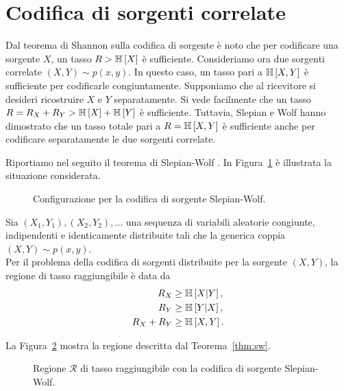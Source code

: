 \section{Codifica di sorgenti correlate}
\label{sec:correlated-sources-encoding}

Dal teorema di Shannon sulla codifica di sorgente
\cite{10.1002/j.1538-7305.1948.tb01338.x} è noto che per codificare una
sorgente \(X\), un tasso \(R > \mathbb{H}\left[ X \right]\) è sufficiente. Consideriamo ora
due sorgenti correlate \((X,Y) \sim p(x, y)\). In questo caso, un tasso pari a
\(\mathbb{H}\left[ X,Y \right]\) è sufficiente per codificarle congiuntamente. Supponiamo che
al ricevitore si desideri ricostruire \(X\) e \(Y\) separatamente. Si vede
facilmente che un tasso \(R = R_X + R_Y > \mathbb{H}\left[ X \right] + \mathbb{H}\left[ Y \right]\) è
sufficiente. Tuttavia, Slepian e Wolf \cite{1055037} hanno dimostrato che un
tasso totale pari a \(R = \mathbb{H}\left[ X,Y \right]\) è sufficiente anche per codificare
separatamente le due sorgenti correlate.

Riportiamo nel seguito il teorema di Slepian-Wolf
\cite{10.1002/047174882X.ch15}. In Figura~\ref{fig:sw-configuration} è
illustrata la situazione considerata.

\begin{figure}[ht]
    \centering
    
    \caption{Configurazione per la codifica di sorgente Slepian-Wolf.}
    \label{fig:sw-configuration}
\end{figure}

\begin{thm}
    \label{thm:sw}

    Sia \((X_1,Y_1),(X_2,Y_2),\dots\) una sequenza di variabili aleatorie
    congiunte, indipendenti e identicamente distribuite tali che la generica
    coppia \((X,Y) \sim p(x, y)\).\\
    Per il problema della codifica di sorgenti distribuite per la sorgente
    \((X,Y)\), la regione di tasso raggiungibile è data da
    \begin{alignat}{1}
        R_X &\ge \mathbb{H}\left[ X \vert Y \right], \label{eq:SW1} \\
        R_Y &\ge \mathbb{H}\left[ Y \vert X \right], \label{eq:SW2} \\
        R_X + R_Y &\ge \mathbb{H}\left[ X,Y \right]. \label{eq:SWsum}
    \end{alignat}
\end{thm}

La Figura~\ref{fig:sw-rate-region} mostra la regione descritta dal
Teorema~\ref{thm:sw}.

\begin{figure}[ht]
    \centering
    
    \caption{Regione \(\mathcal{R}\) di tasso raggiungibile con la codifica di
    sorgente Slepian-Wolf.}
    \label{fig:sw-rate-region}
\end{figure}
